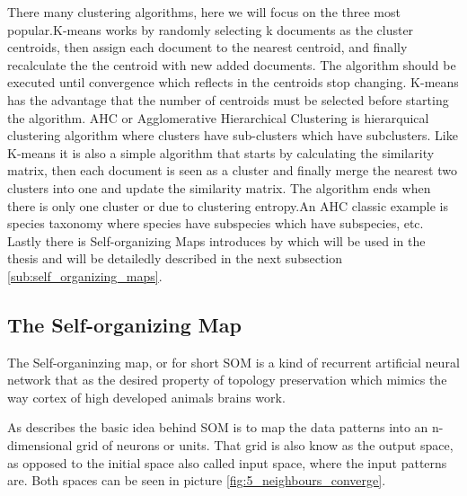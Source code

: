 There many clustering algorithms, here we will focus on the three most popular.K-means works by randomly selecting k documents as the cluster centroids, then assign each document to the nearest centroid, and finally recalculate the the centroid with new added documents. The algorithm should be executed until convergence which reflects in the centroids stop changing. K-means has the advantage that the number of centroids must be selected before starting the algorithm.
AHC or Agglomerative Hierarchical Clustering is hierarquical clustering algorithm where clusters have sub-clusters which have subclusters. Like K-means it is also a simple algorithm that starts by calculating the similarity matrix, then each document is seen as a cluster and finally merge the nearest two clusters into one and update the similarity matrix. The algorithm ends when there is only one cluster or due to clustering entropy.An AHC classic example is species taxonomy where species have subspecies which have subspecies, etc.
Lastly there is Self-organizing Maps introduces by \citep{Kohonen1990} which will be used in the thesis and will be detailedly described in the next subsection \ref{sub:self_organizing_maps}.



\subsection{The Self-organizing Map} %
\label{sub:the_self_organizing_map}

The Self-organinzing map, or for short SOM is a kind of recurrent artificial neural network that as the desired property of topology preservation which mimics the way cortex of high developed animals brains work.

As \citep{Bacao2005} describes the basic idea behind SOM is to map the data patterns into an n-dimensional grid of neurons or units. That grid is also know as the output space, as opposed to the initial space also called input space, where the input patterns are. Both spaces can be seen in picture \ref{fig:5_neighbours_converge}.

